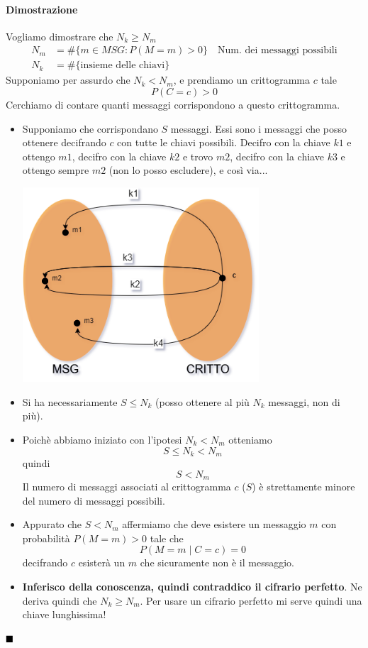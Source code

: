 \paragraph{Dimostrazione}Vogliamo dimostrare che $N_k \geq N_m$
\begin{align*} 
	N_m &= \#\{m \in MSG : P(M=m)>0\}\,\,\,\,\,\,\text{Num. dei messaggi possibili}\\
	N_k &= \#\{\text{insieme delle chiavi}\}
\end{align*}
Supponiamo per assurdo che $N_k < N_m$, e prendiamo un crittogramma $c$ tale $$P(C=c)>0$$Cerchiamo di contare quanti messaggi corrispondono a questo crittogramma.
\begin{itemize}
	\item Supponiamo che corrispondano $S$ messaggi. Essi sono i messaggi che posso ottenere decifrando $c$ con tutte le chiavi possibili. Decifro con la chiave $k1$ e ottengo $m1$, decifro con la chiave $k2$ e trovo $m2$, decifro con la chiave $k3$ e ottengo sempre $m2$ (non lo posso escludere), e così via...
	\begin{center}
		\includegraphics[width = 250pt]{images/Shannon_proof.png}
	\end{center}
	\item Si ha necessariamente $S \leq N_k$ (posso ottenere al più $N_k$ messaggi, non di più).
	\item Poichè abbiamo iniziato con l'ipotesi $N_k < N_m$ otteniamo
	$$S \leq N_k < N_m$$
	quindi
	$$S < N_m$$
	Il numero di messaggi associati al crittogramma $c$ ($S$) è strettamente minore del numero di messaggi possibili.
	\item Appurato che  $S < N_m$ affermiamo che deve esistere un messaggio $m$ con probabilità $P(M=m)>0$ tale che
	$$ P(M=m \mid C=c) = 0 $$
	decifrando $c$ esisterà un $m$ che sicuramente non è il messaggio.
	\item \textbf{Inferisco della conoscenza, quindi contraddico il cifrario perfetto}. Ne deriva quindi che $N_k \geq N_m$. Per usare un cifrario perfetto mi serve quindi una chiave lunghissima!
\end{itemize} 
$\hfill\blacksquare$


